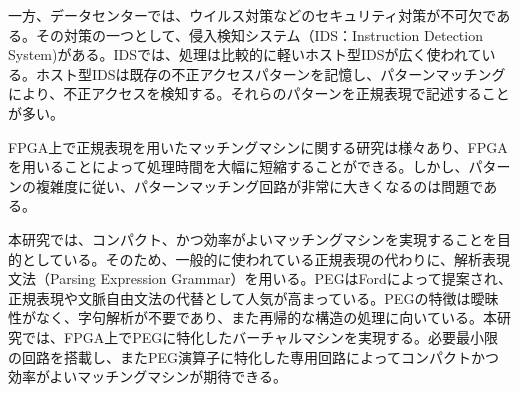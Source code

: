 \documentclass[submit,techrep]{ipsj}
\begin{document}
一方、データセンターでは、ウイルス対策などのセキュリティ対策が不可欠である。その対策の一つとして、侵入検知システム（IDS：Instruction Detection System)がある。IDSでは、処理は比較的に軽いホスト型IDSが広く使われている。ホスト型IDSは既存の不正アクセスパターンを記憶し、パターンマッチングにより、不正アクセスを検知する。それらのパターンを正規表現で記述することが多い。

FPGA上で正規表現を用いたマッチングマシンに関する研究は様々あり\cite{RG1,RG2,RG3,RG4}、FPGAを用いることによって処理時間を大幅に短縮することができる。しかし、パターンの複雑度に従い、パターンマッチング回路が非常に大きくなるのは問題である。

本研究では、コンパクト、かつ効率がよいマッチングマシンを実現することを目的としている。そのため、一般的に使われている正規表現の代わりに、解析表現文法（Parsing Expression Grammar）\cite{PEG}を用いる。PEGはFordによって提案され、正規表現や文脈自由文法の代替として人気が高まっている。PEGの特徴は曖昧性がなく、字句解析が不要であり、また再帰的な構造の処理に向いている。本研究では、FPGA上でPEGに特化したバーチャルマシンを実現する。必要最小限の回路を搭載し、またPEG演算子に特化した専用回路によってコンパクトかつ効率がよいマッチングマシンが期待できる。




\end{document}
